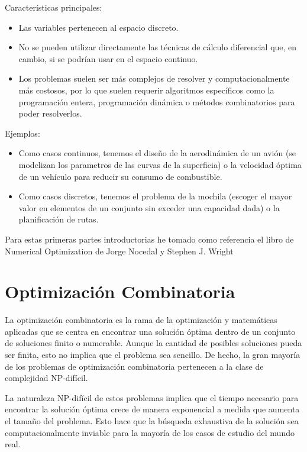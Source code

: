 \documentclass[12pt,a4paper]{book}
\begin{document}
Características principales:
\begin{itemize}
    \item Las variables pertenecen al espacio discreto.
    \item No se pueden utilizar directamente las técnicas de cálculo diferencial que, en cambio, si se podrían usar en el espacio continuo.
    \item Los problemas suelen ser más complejos de resolver y computacionalmente más costosos, por lo que suelen requerir algoritmos específicos como la programación entera, programación dinámica o métodos combinatorios para poder resolverlos.
\end{itemize}

Ejemplos:
\begin{itemize}
    \item Como casos continuos, tenemos el diseño de la aerodinámica de un avión (se modelizan los parametros de las curvas de la superficia) o la velocidad óptima de un vehículo para reducir su consumo de combustible.
    \item Como casos discretos, tenemos el problema de la mochila (escoger el mayor valor en elementos de un conjunto sin exceder una capacidad dada) o la planificación de rutas.
\end{itemize}

Para estas primeras partes introductorias he tomado como referencia el libro \cite{Numerical_optimization_nocedal_wright} de Numerical Optimization de Jorge Nocedal y Stephen J. Wright

\section{Optimización Combinatoria}
La optimización combinatoria es la rama de la optimización y matemáticas aplicadas que se centra en encontrar una solución óptima dentro de un conjunto de soluciones finito o numerable. Aunque la cantidad de posibles soluciones pueda ser finita, esto no implica que el problema sea sencillo. De hecho, la gran mayoría de los problemas de optimización combinatoria pertenecen a la clase de complejidad NP-difícil.

La naturaleza NP-difícil de estos problemas implica que el tiempo necesario para encontrar la solución óptima crece de manera exponencial a medida que aumenta el tamaño del problema. Esto hace que la búsqueda exhaustiva de la solución sea computacionalmente inviable para la mayoría de los casos de estudio del mundo real.
\end{document}
